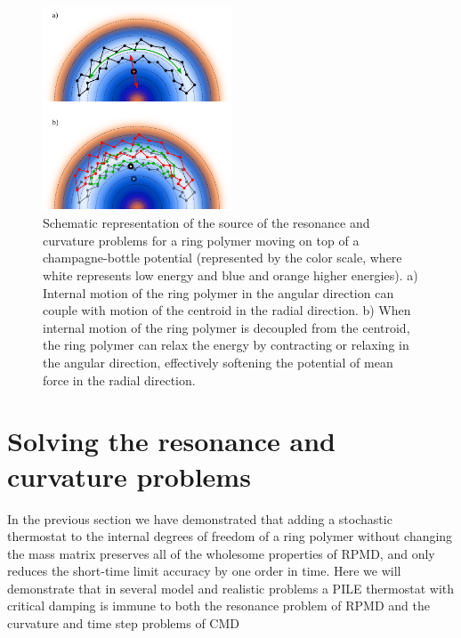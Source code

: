 \documentclass[aps,prb,superscriptaddress,amsmath,amssymb,showpacs,twocolumn]{revtex4}
\begin{document}
\begin{figure}[htbp]
\centering
\includegraphics[width=0.5\textwidth]{figures/champagne.pdf}
\caption{Schematic representation of the source of the resonance and curvature problems for a ring polymer 
moving on top of a champagne-bottle potential (represented by the color scale, where white represents low energy and blue 
and orange higher energies). a) Internal motion of the ring polymer in the angular direction can couple with motion 
of the centroid in the radial direction. b) When internal motion of the ring polymer is decoupled from the centroid, 
the ring polymer can relax the energy by contracting or relaxing in the angular direction, effectively softening the
potential of mean force in the radial direction. }
\label{fig:champagne}
\end{figure}

\section{Solving the resonance and curvature problems}

In the previous section we have demonstrated that adding a stochastic thermostat to the internal degrees of freedom
of a ring polymer without changing the mass matrix preserves all of the wholesome properties of RPMD, and only reduces
the short-time limit accuracy by one order in time. 
Here we will demonstrate that in several model and realistic problems a PILE thermostat with critical damping 
is immune to both the resonance problem of RPMD and the curvature and time step problems of CMD


\end{document}
